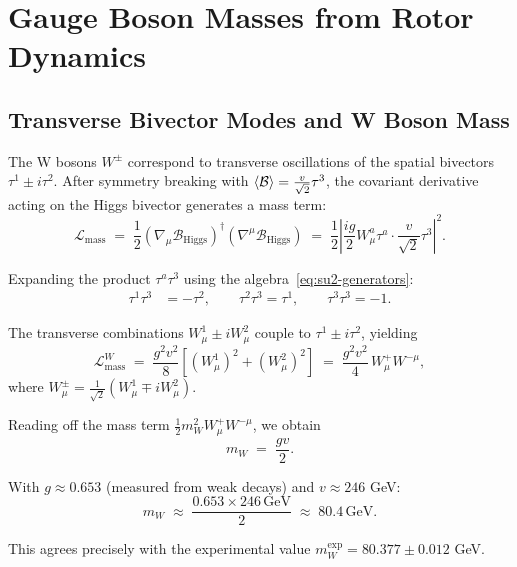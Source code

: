 \documentclass[11pt,a4paper]{article}
\newcommand{\Biv}{\mathcal{B}}
\newcommand{\D}{\nabla}                        %
\newcommand{\Lag}{\mathcal{L}}
\theoremstyle{definition}
\theoremstyle{plain}
\theoremstyle{remark}
\begin{document}
\section{Gauge Boson Masses from Rotor Dynamics}\label{sec:gauge-masses}

\subsection{Transverse Bivector Modes and W Boson Mass}

The W bosons $W^\pm$ correspond to transverse oscillations of the spatial bivectors $\tau^1 \pm i\tau^2$. After symmetry breaking with $\ev{\Biv} = \frac{v}{\sqrt{2}}\tau^3$, the covariant derivative acting on the Higgs bivector generates a mass term:
\begin{equation}
  \Lag_{\text{mass}} \;=\; \frac{1}{2}(\D_\mu \Biv_{\text{Higgs}})^\dagger(\D^\mu \Biv_{\text{Higgs}})
  \;=\; \frac{1}{2}\left|\frac{ig}{2}W_\mu^a\tau^a \cdot \frac{v}{\sqrt{2}}\tau^3\right|^2.
\end{equation}

Expanding the product $\tau^a\tau^3$ using the algebra~\eqref{eq:su2-generators}:
\begin{align}
  \tau^1\tau^3 &= -\tau^2, \qquad \tau^2\tau^3 = \tau^1, \qquad \tau^3\tau^3 = -1.
\end{align}

The transverse combinations $W_\mu^1 \pm i W_\mu^2$ couple to $\tau^1 \pm i\tau^2$, yielding
\begin{equation}
  \Lag_{\text{mass}}^{W} \;=\; \frac{g^2 v^2}{8}\left[(W_\mu^1)^2 + (W_\mu^2)^2\right]
  \;=\; \frac{g^2 v^2}{4}\,W_\mu^+ W^{-\mu},
\end{equation}
where $W_\mu^\pm = \frac{1}{\sqrt{2}}(W_\mu^1 \mp i W_\mu^2)$.

Reading off the mass term $\frac{1}{2}m_W^2 W_\mu^+ W^{-\mu}$, we obtain
\begin{equation}
  \boxed{m_W \;=\; \frac{gv}{2}.}
  \label{eq:w-mass}
\end{equation}

With $g \approx 0.653$ (measured from weak decays) and $v \approx 246$ GeV:
\begin{equation}
  m_W \;\approx\; \frac{0.653 \times 246\,\text{GeV}}{2} \;\approx\; 80.4\,\text{GeV}.
\end{equation}

This agrees precisely with the experimental value $m_W^{\exp} = 80.377 \pm 0.012$ GeV.
\end{document}
